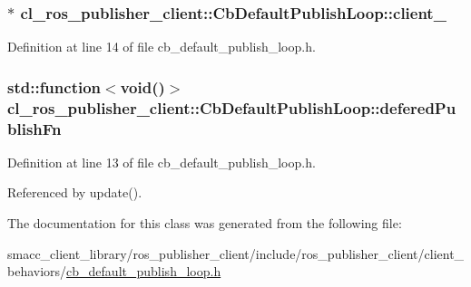 \subsubsection[{\texorpdfstring{client\+\_\+}{client_}}]{$\ast$ cl\+\_\+ros\+\_\+publisher\+\_\+client\+::\+Cb\+Default\+Publish\+Loop\+::client\+\_\+\hspace{0.3cm}{\ttfamily [private]}}\hypertarget{classcl__ros__publisher__client_1_1CbDefaultPublishLoop_ada1d3d64ab6bf67473266560c07596b9}{}\label{classcl__ros__publisher__client_1_1CbDefaultPublishLoop_ada1d3d64ab6bf67473266560c07596b9}


Definition at line 14 of file cb\+\_\+default\+\_\+publish\+\_\+loop.\+h.

\subsubsection[{\texorpdfstring{defered\+Publish\+Fn}{deferedPublishFn}}]{\setlength{\rightskip}{0pt plus 5cm}std\+::function$<$void()$>$ cl\+\_\+ros\+\_\+publisher\+\_\+client\+::\+Cb\+Default\+Publish\+Loop\+::defered\+Publish\+Fn\hspace{0.3cm}{\ttfamily [private]}}\hypertarget{classcl__ros__publisher__client_1_1CbDefaultPublishLoop_adbba1961e7aebdd5d594b54cf5ffd663}{}\label{classcl__ros__publisher__client_1_1CbDefaultPublishLoop_adbba1961e7aebdd5d594b54cf5ffd663}


Definition at line 13 of file cb\+\_\+default\+\_\+publish\+\_\+loop.\+h.



Referenced by update().



The documentation for this class was generated from the following file\+:\begin{DoxyCompactItemize}
\item 
smacc\+\_\+client\+\_\+library/ros\+\_\+publisher\+\_\+client/include/ros\+\_\+publisher\+\_\+client/client\+\_\+behaviors/\hyperlink{cb__default__publish__loop_8h}{cb\+\_\+default\+\_\+publish\+\_\+loop.\+h}\end{DoxyCompactItemize}
